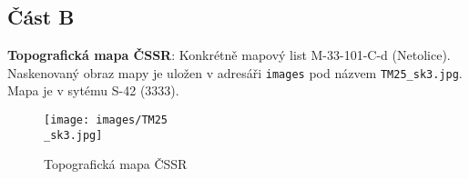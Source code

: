\subsection*{Část B}

\textbf{Topografická mapa ČSSR}: Konkrétně mapový list M-33-101-C-d (Netolice). Naskenovaný obraz mapy je uložen v adresáři \texttt{images} pod názvem \texttt{TM25\_sk3.jpg}. Mapa je v sytému S-42 (3333).

 \begin{figure}[H]
     \centering
     \texttt{[image: images/TM25\\\_sk3.jpg]}
     \caption{Topografická mapa ČSSR}
 \end{figure}